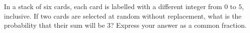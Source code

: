 In a stack of six cards, each card is labelled with a different integer from $0$ to $5$, inclusive. If two cards are selected at random without replacement, what is the probability that their sum will be $3$? Express your answer as a common fraction.
